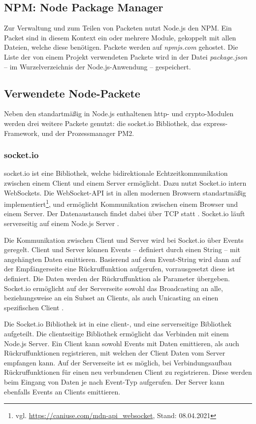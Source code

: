 \subsection{NPM: Node Package Manager}
Zur Verwaltung und zum Teilen von Packeten nutzt Node.js den \ac{NPM}. Ein Packet sind in diesem Kontext ein oder mehrere Module, gekoppelt mit allen Dateien, welche diese benötigen. Packete werden auf \textit{npmjs.com} gehostet. Die Liste der von einem Projekt verwendeten Packete wird in der Datei \textit{package.json} -- im Wurzelverzeichnis der Node.js-Anwendung -- gespeichert.

\subsection{Verwendete Node-Packete}
Neben den standartmäßig in Node.js enthaltenen \glqq{}http\grqq{}- und \glqq{}crypto\grqq{}-Modulen werden drei weitere Packete genutzt: die \glqq{}socket.io\grqq{} Bibliothek, das \glqq{}express\grqq{}-Framework, und der Prozessmanager \glqq{}PM2\grqq{}.

\subsubsection{socket.io}
\glqq{}socket.io\grqq{} ist eine Bibliothek, welche bidirektionale Echtzeitkommunikation zwischen einem Client und einem Server ermöglicht. Dazu nutzt Socket.io intern WebSockets\cite{sio}. Die WebSocket-API ist in allen modernen Browsern standartmäßig implementiert\footnote{vgl. \url{https://caniuse.com/mdn-api_websocket}, Stand: 08.04.2021}, und ermöglicht Kommunikation zwischen einem Browser und einem Server. Der Datenaustausch findet dabei über \ac{TCP} statt \cite{websocketRFC}. Socket.io läuft serverseitig auf einem Node.js Server \cite{sio}.\par

Die Kommunikation zwischen Client und Server wird bei Socket.io über Events geregelt. Client und Server können Events -- definiert durch einen String -- mit angehängten Daten emittieren. Basierend auf dem Event-String wird dann auf der Empfängerseite eine Rückruffunktion aufgerufen, vorrausgesetzt diese ist definiert. Die Daten werden der Rückruffunktion als Parameter übergeben. Socket.io ermöglicht auf der Serverseite sowohl das Broadcasting an alle, beziehungsweise an ein Subset an Clients, als auch Unicasting an einen spezifischen Client \cite{sio}.\par

Die Socket.io Bibliothek ist in eine client-, und eine serverseitige Bibliothek aufgeteilt. Die clientseitige Bibliothek ermöglicht das Verbinden mit einem Node.js Server. Ein Client kann sowohl Events mit Daten emittieren, als auch Rückruffunktionen registrieren, mit welchen der Client Daten vom Server empfangen kann. Auf der Serverseite ist es möglich, bei Verbindungsaufbau Rückruffunktionen für einen neu verbundenen Client zu registrieren. Diese werden beim Eingang von Daten je nach Event-Typ aufgerufen. Der Server kann ebenfalls Events an Clients emittieren.

